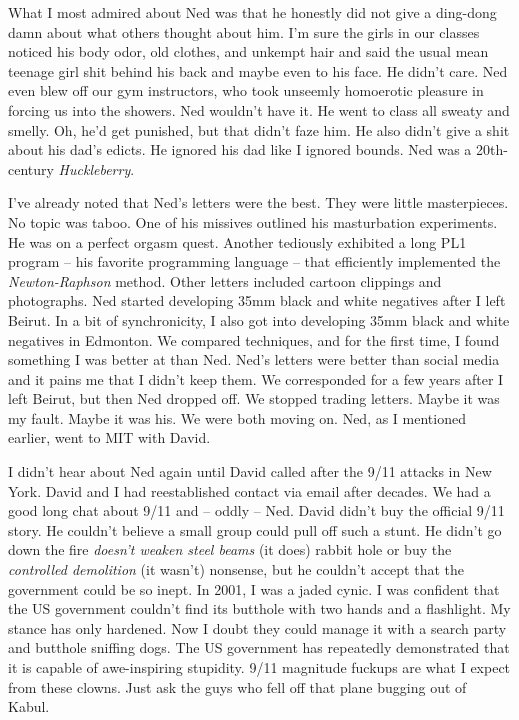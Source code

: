 What I most admired about Ned was that he honestly did not give a
ding-dong damn about what others thought about him. I'm sure the girls
in our classes noticed his body odor, old clothes, and unkempt hair and
said the usual mean teenage girl shit behind his back and maybe even to
his face. He didn't care. Ned even blew off our gym instructors, who
took unseemly homoerotic pleasure in forcing us into the showers. Ned
wouldn't have it. He went to class all sweaty and smelly. Oh, he'd get
punished, but that didn't faze him. He also didn't give a shit about his
dad's edicts. He ignored his dad like I ignored bounds. Ned was a
20th-century \emph{Huckleberry}.

I've already noted that Ned's letters were the best. They were little
masterpieces. No topic was taboo. One of his missives outlined his
masturbation experiments. He was on a perfect orgasm quest. Another
tediously exhibited a long PL1 program -- his favorite programming
language -- that efficiently implemented the \emph{Newton-Raphson}
method. Other letters included cartoon clippings and photographs. Ned
started developing 35mm black and white negatives after I left Beirut.
In a bit of synchronicity, I also got into developing 35mm black and
white negatives in Edmonton. We compared techniques, and for the first
time, I found something I was better at than Ned. Ned's letters were
better than social media and it pains me that I didn't keep them. We
corresponded for a few years after I left Beirut, but then Ned dropped
off. We stopped trading letters. Maybe it was my fault. Maybe it was
his. We were both moving on. Ned, as I mentioned earlier, went to MIT
with David.

I didn't hear about Ned again until David called after the 9/11 attacks
in New York. David and I had reestablished contact via email after
decades. We had a good long chat about 9/11 and -- oddly -- Ned. David
didn't buy the official 9/11 story. He couldn't believe a small group
could pull off such a stunt. He didn't go down the fire \emph{doesn't
weaken steel beams} (it does) rabbit hole or buy the \emph{controlled
demolition} (it wasn't) nonsense, but he couldn't accept that the
government could be so inept. In 2001, I was a jaded cynic. I was
confident that the US government couldn't find its butthole with two
hands and a flashlight. My stance has only hardened. Now I doubt they
could manage it with a search party and butthole sniffing dogs. The US
government has repeatedly demonstrated that it is capable of
awe-inspiring stupidity. 9/11 magnitude fuckups are what I expect from
these clowns. Just ask the guys who fell off that plane bugging out of
Kabul.

